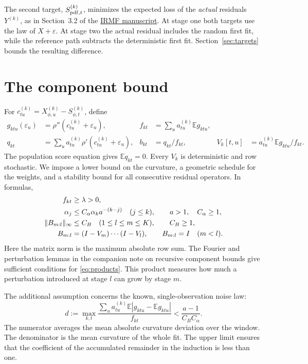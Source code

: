 \documentclass[11pt]{article}
\newcommand{\E}{\mathbb E}
\newcommand{\norm}[1]{\lVert#1\rVert}
\theoremstyle{remark}
\begin{document}
The second target, \(S_{{\rm pdf},t}^{(k)}\), minimizes the expected loss
of the \emph{actual} residuals \(Y^{(k)}\), as in Section~3.2 of the
\href{../IMF.pdf}{IRMF manuscript}. At stage one both targets use the law of \(X+\varepsilon\).
At stage two the actual residual includes the random first fit, while
the reference path subtracts the deterministic first fit.
Section~\ref{sec:targets} bounds the resulting difference.

\clearpage
\section{The component bound}

For \(c_{tu}^{(k)}=X_{\phi,u}^{(k)}-S_{\phi,t}^{(k)}\), define
\begin{align*}
 g_{ktu}(\varepsilon_u)&=\rho''(c_{tu}^{(k)}+\varepsilon_u),&
 f_{kt}&=\sum_u a_{tu}^{(k)}\E g_{ktu},\\
 q_{kt}&=\sum_u a_{tu}^{(k)}\rho'(c_{tu}^{(k)}+\varepsilon_u),&
 b_{kt}&=q_{kt}/f_{kt},&
 V_k[t,u]&=a_{tu}^{(k)}\E g_{ktu}/f_{kt}.
\end{align*}
The population score equation gives \(\E q_{kt}=0\).
Every \(V_k\) is deterministic and row stochastic. We impose a lower bound on the curvature, a geometric schedule
for the weights, and a stability bound for all consecutive residual
operators. In formulas,
\begin{align}
 f_{kt}&\ge\lambda>0,\label{eq:curvature}\\
 \alpha_j&\le C_\alpha\alpha_k a^{-(k-j)}
       \quad(j\le k),\qquad a>1,\quad C_\alpha\ge1,\label{eq:schedule}\\
 \norm{B_{m:l}}_\infty&\le C_B\quad
       (1\le l\le m\le K),\qquad C_B\ge1,\label{eq:products}\\
 B_{m:l}&=(I-V_m)\cdots(I-V_l),\qquad B_{m:l}=I\quad(m<l).\notag
\end{align}
Here the matrix norm is the maximum absolute row sum. The Fourier and perturbation lemmas in the companion note on recursive component bounds
give sufficient conditions for \eqref{eq:products}. This product measures
how much a perturbation introduced at stage \(l\) can grow by stage \(m\).

The additional assumption concerns the known, single-observation noise law:
\begin{equation}
 d:=\max_{k,t}\frac{\sum_u a_{tu}^{(k)}
                \E|g_{ktu}-\E g_{ktu}|}{f_{kt}}
       <\frac{a-1}{C_BC_\alpha}.
 \label{eq:dispersion}
\end{equation}
The numerator averages the mean absolute curvature deviation over the window.
The denominator is the mean curvature of the whole
fit. The upper limit ensures that the coefficient of the accumulated
remainder in the induction is less than one.
\end{document}
